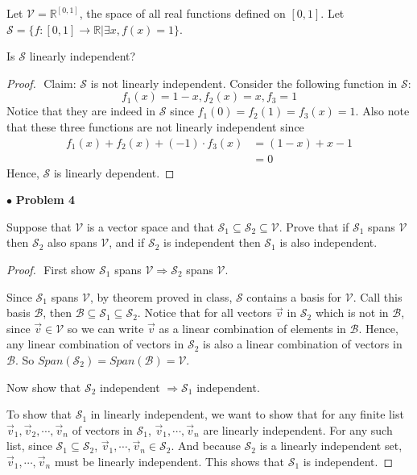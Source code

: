 \documentclass{article}
\begin{document}
\begin{itshape}
Let $\mathcal{V} = \mathbb{R}^{[0,1]}$, the space of all real functions defined on $[0,1]$. Let $\mathcal{S} = \{ f:[0,1] \to \mathbb{R} | \exists x,f(x)=1 \}$.

Is $\mathcal{S}$ linearly independent?
\end{itshape}
\medskip

\begin{proof}
$ $\newline
Claim: $\mathcal{S}$ is not linearly independent.
\medskip
Consider the following function in $\mathcal{S}$:
$$f_1(x) = 1-x, f_2(x)=x, f_3 = 1$$
Notice that they are indeed in $\mathcal{S}$ since $f_1(0)= f_2(1)= f_3(x)=1$.
Also note that these three functions are not linearly independent since
\begin{align*}
f_1(x) + f_2(x) + (-1) \cdot f_3(x) &= (1-x)+x-1 \\
&= 0
\end{align*} 
Hence, $\mathcal{S}$ is linearly dependent.
\end{proof}

\newpage
$ \bullet$ \textbf{Problem 4}
\medskip

\begin{itshape}
Suppose that $\mathcal{V}$ is a vector space and that $\mathcal{S}_1 \subseteq \mathcal{S}_2 \subseteq \mathcal{V}$. Prove that if $\mathcal{S}_1$ spans $\mathcal{V}$ then $\mathcal{S}_2$ also spans $\mathcal{V}$, and if $\mathcal{S}_2$ is independent then  $\mathcal{S}_1$ is also independent.
\end{itshape}
\medskip

\begin{proof}
$ $\newline
First show $\mathcal{S}_1$ spans $\mathcal{V} \Rightarrow \mathcal{S}_2$ spans $\mathcal{V}$.

Since $\mathcal{S}_1$ spans $\mathcal{V}$, by theorem proved in class, $\mathcal{S}$ contains a basis for $\mathcal{V}$. Call this basis $\mathcal{B}$, then $\mathcal{B} \subseteq \mathcal{S}_1 \subseteq \mathcal{S}_2$. Notice that for all vectors $\vec{v} $ in $\mathcal{S}_2$ which is not in $\mathcal{B}$, since $\vec{v} \in \mathcal{V}$ so we can write $\vec{v}$ as a linear combination of elements in $\mathcal{B}$. Hence, any linear combination of vectors in $\mathcal{S}_2$ is also a linear combination of vectors in $\mathcal{B}$. So $Span(\mathcal{S}_2) =Span(\mathcal{B}) = \mathcal{V}$.

\bigskip
Now show that $\mathcal{S}_2$ independent $\Rightarrow \mathcal{S}_1$ independent.

To show that $\mathcal{S}_1$ in linearly independent, we want to show that for any finite list $\vec{v}_1, \vec{v}_2, \cdots , \vec{v}_n$ of vectors in $\mathcal{S}_1$, $\vec{v}_1, \cdots, \vec{v}_n$ are linearly independent. For any such list, since $\mathcal{S}_1 \subseteq \mathcal{S}_2$, $\vec{v}_1, \cdots, \vec{v}_n \in \mathcal{S}_2$. And because $\mathcal{S}_2$ is a linearly independent set, $\vec{v}_1, \cdots, \vec{v}_n$ must be linearly independent. This shows that $\mathcal{S}_1$ is independent. 

\end{proof}
\end{document}
